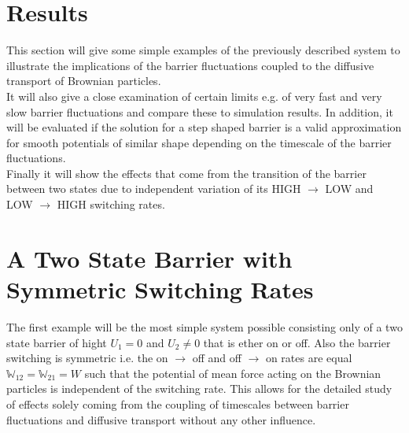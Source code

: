 \newpage
\section{Results}
This section will give some simple examples of the previously described system to illustrate the implications of the barrier fluctuations coupled to the diffusive transport of Brownian particles.\\
It will also give a close examination of certain limits e.g. of very fast and very slow barrier fluctuations and compare these to simulation results. In addition, it will be evaluated if the solution for a step shaped barrier is a valid approximation for smooth potentials of similar shape depending on the timescale of the barrier fluctuations. \\
Finally it will show the effects that come from the transition of the barrier between two states due to independent variation of its HIGH $\rightarrow$ LOW and LOW $\rightarrow$ HIGH switching rates.
\section{A Two State Barrier with Symmetric Switching Rates}
The first example will be the most simple system possible consisting only of a two state barrier of hight $U_1 = 0$ and $U_2 \ne 0$ that is ether on or off. Also the barrier switching is symmetric i.e. the on $\rightarrow$ off and off $\rightarrow$ on rates are equal $\mathbb{W}_{12}=\mathbb{W}_{21}=W$ such that the potential of mean force acting on the Brownian particles is independent of the switching rate.
This allows for the detailed study of effects solely coming from the coupling of timescales between barrier fluctuations and diffusive transport without any other influence.
